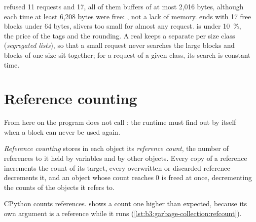  refused 11 requests and  17, all of them buffers of at most 2,016 bytes, although each time at least 6,208 bytes were free: , not a lack of memory.  ends with 17 free blocks under 64 bytes, slivers too small for almost any request.  is under 10~\%, the price of the tags and the rounding. A real  keeps a separate  per size class (\emph{segregated lists}), so that a small request never searches the large blocks and blocks of one size sit together; for a request of a given class, its search is constant time.

\section{Reference counting}\label{sec:b3:garbage-collection:refcount}

From here on the program does not call : the runtime must find out by itself when a block can never be used again.

\begin{definition}\label{def:b3:garbage-collection:refcount}
\emph{Reference counting} stores in each object its \emph{reference count}, the number of references to it held by variables and by other objects. Every copy of a reference increments the count of its target, every overwritten or discarded reference decrements it, and an object whose count reaches 0 is freed at once, decrementing the counts of the objects it refers to.
\end{definition}

CPython counts references.  shows a count one higher than expected, because its own argument is a reference while it runs (\cref{lst:b3:garbage-collection:refcount}). %

\label{lst:b3:garbage-collection:refcount}

\label{out:b3:garbage-collection:refcount}

